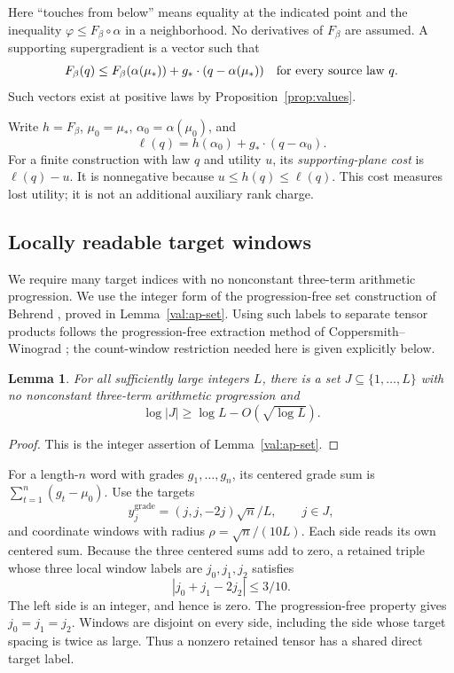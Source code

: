 \documentclass[11pt]{article}
\numberwithin{equation}{section}
\newtheorem{lemma}[theorem]{Lemma}
\theoremstyle{definition}
\theoremstyle{remark}
\begin{document}
Here ``touches from below'' means equality at the indicated point and the
inequality \(\varphi\leq F_\beta\circ\alpha\) in a neighborhood.  No
derivatives of \(F_\beta\) are assumed.  A supporting supergradient is a
vector such that
\[
F_\beta(q)\leq F_\beta(\alpha(\mu_*))+g_*\cdot(q-\alpha(\mu_*))
 \quad\hbox{for every source law }q.
\]
Such vectors exist at positive laws by Proposition~\ref{prop:values}.

Write \(h=F_\beta\), \(\mu_0=\mu_*\), \(\alpha_0=\alpha(\mu_0)\), and
\[
 \ell(q)=h(\alpha_0)+g_*\cdot(q-\alpha_0).
\]
For a finite construction with law \(q\) and utility \(u\), its
\emph{supporting-plane cost} is \(\ell(q)-u\).  It is nonnegative because
\(u\leq h(q)\leq\ell(q)\).  This cost measures lost utility; it is not
an additional auxiliary rank charge.

\subsection{Locally readable target windows}

We require many target indices with no nonconstant three-term arithmetic
progression.  We use the integer form of the progression-free set
construction of Behrend \cite{behrend}, proved in
Lemma~\ref{val:ap-set}.  Using such labels to separate tensor products
follows the progression-free extraction method of
Coppersmith--Winograd \cite[Sections~4--7]{cw}; the count-window
restriction needed here is given explicitly below.

\begin{lemma}\label{ap:behrend}
For all sufficiently large integers \(L\), there is a set
\(J\subseteq\{1,\ldots,L\}\) with no nonconstant three-term arithmetic
progression and
\[
 \log|J|\geq\log L-O(\sqrt{\log L}).
\]
\end{lemma}
\begin{proof}
This is the integer assertion of Lemma~\ref{val:ap-set}.
\end{proof}

For a length-\(n\) word with grades \(g_1,\ldots,g_n\), its centered
grade sum is \(\sum_{t=1}^n(g_t-\mu_0)\).  Use the targets
\begin{equation}\label{ap:target}
 y_j^{\mathrm{grade}}=(j,j,-2j)\sqrt n/L,
 \qquad j\in J,
\end{equation}
and coordinate windows with radius
\(\rho=\sqrt n/(10L)\).  Each side reads its own centered sum.
Because the three centered sums add to zero, a retained triple whose
three local window labels are \(j_0,j_1,j_2\) satisfies
\[
 |j_0+j_1-2j_2|\leq3/10.
\]
The left side is an integer, and hence is zero.  The progression-free
property gives \(j_0=j_1=j_2\).  Windows are disjoint on every side,
including the side whose target spacing is twice as large.  Thus a
nonzero retained tensor has a shared direct target label.
\end{document}
